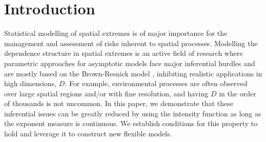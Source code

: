 \documentclass[12pt]{article}
\begin{document}
\section{Introduction}

Statistical modelling of spatial extremes is of major importance for the management and assessment of risks inherent to spatial processes. 
Modelling the dependence structure in spatial extremes is an active field of research where parametric approaches for asymptotic models face major inferential hurdles and are mostly based on the Brown-Resnick model \citep{Brown.Resnick:1977, Kabluchko.etal:2009}, inhibiting realistic applications in high dimensions, $D$. For example, environmental processes are often observed over large spatial regions and/or with fine resolution, and having $D$ in the order of thousands is not uncommon. In this paper, we demonstrate that these inferential issues can be greatly reduced by using the intensity function as long as the exponent measure is continuous. We establish conditions for this property to hold and leverage it to construct new flexible models. 
\end{document}
